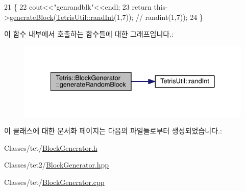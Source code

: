 \begin{DoxyCode}
21                                         \{
22                 cout<<\textcolor{stringliteral}{"genrandblk"}<<endl;
23                 \textcolor{keywordflow}{return} this->\hyperlink{class_tetris_1_1_block_generator_a581b22cebe170d3fe8b51130c01e7a22}{generateBlock}(\hyperlink{class_tetris_util_a0a60e809425ddb416a500bcc03cf7061}{TetrisUtil::randInt}(1,7)); \textcolor{comment}{//
      randint(1,7));}
24             \}
\end{DoxyCode}
이 함수 내부에서 호출하는 함수들에 대한 그래프입니다.\+:
\nopagebreak
\begin{figure}[H]
\begin{center}
\leavevmode
\includegraphics[width=332pt]{d3/d50/class_tetris_1_1_block_generator_a434df5baf3944a534492b63763b532a6_cgraph}
\end{center}
\end{figure}


이 클래스에 대한 문서화 페이지는 다음의 파일들로부터 생성되었습니다.\+:\begin{DoxyCompactItemize}
\item 
Classes/tet/\hyperlink{_block_generator_8h}{Block\+Generator.\+h}\item 
Classes/tet2/\hyperlink{_block_generator_8hpp}{Block\+Generator.\+hpp}\item 
Classes/tet/\hyperlink{_block_generator_8cpp}{Block\+Generator.\+cpp}\end{DoxyCompactItemize}
